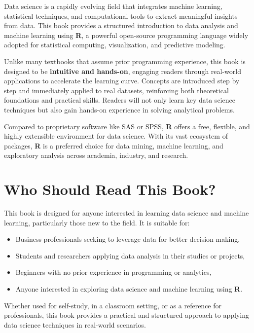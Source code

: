 \documentclass[
  11pt,
]{book}
\providecommand{\tightlist}{%
  \setlength{\itemsep}{0pt}\setlength{\parskip}{0pt}}
\theoremstyle{definition}
\theoremstyle{definition}
\theoremstyle{definition}
\theoremstyle{definition}
\theoremstyle{remark}
\begin{document}
Data science is a rapidly evolving field that integrates machine learning, statistical techniques, and computational tools to extract meaningful insights from data. This book provides a structured introduction to data analysis and machine learning using \textbf{R}, a powerful open-source programming language widely adopted for statistical computing, visualization, and predictive modeling.

Unlike many textbooks that assume prior programming experience, this book is designed to be \textbf{intuitive and hands-on}, engaging readers through real-world applications to accelerate the learning curve. Concepts are introduced step by step and immediately applied to real datasets, reinforcing both theoretical foundations and practical skills. Readers will not only learn key data science techniques but also gain hands-on experience in solving analytical problems.

Compared to proprietary software like SAS or SPSS, \textbf{R} offers a free, flexible, and highly extensible environment for data science. With its vast ecosystem of packages, \textbf{R} is a preferred choice for data mining, machine learning, and exploratory analysis across academia, industry, and research.

\section*{Who Should Read This Book?}\label{who-should-read-this-book}


This book is designed for anyone interested in learning data science and machine learning, particularly those new to the field. It is suitable for:

\begin{itemize}
\tightlist
\item
  Business professionals seeking to leverage data for better decision-making,\\
\item
  Students and researchers applying data analysis in their studies or projects,\\
\item
  Beginners with no prior experience in programming or analytics,\\
\item
  Anyone interested in exploring data science and machine learning using \textbf{R}.
\end{itemize}

Whether used for self-study, in a classroom setting, or as a reference for professionals, this book provides a practical and structured approach to applying data science techniques in real-world scenarios.
\end{document}
